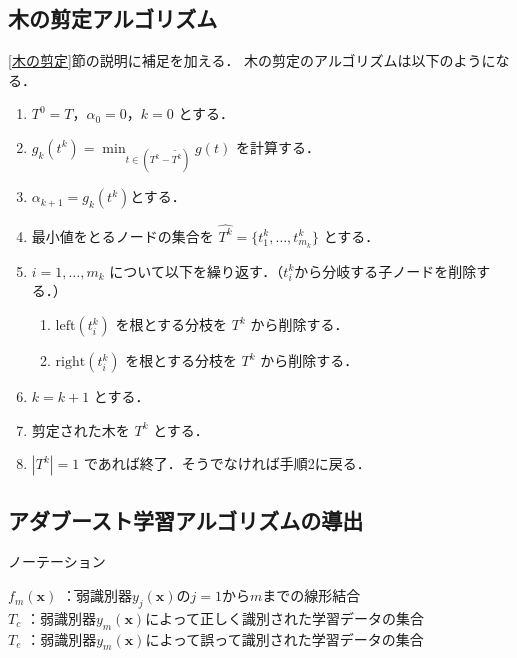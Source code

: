 \documentclass[dvipdfmx]{jreport}
\begin{document}
\subsection{木の剪定アルゴリズム}
\ref{木の剪定}節の説明に補足を加える．
木の剪定のアルゴリズムは以下のようになる．
\begin{tcolorbox}[title=\textbf{木の剪定アルゴリズム}]
    \begin{enumerate}
        \item $T^0 = T$，$\alpha_0=0$，$k=0$ とする．
        \item $g_k(t^k) = \min_{t \in (T^k - \tilde{T^k})}g(t)$ を計算する．
        \item $\alpha_{k+1} = g_k(t^k)$とする．
        \item 最小値をとるノードの集合を $\hat{T^k} = \{t^k_1, \ldots, t^k_{m_k}\}$ とする．
        \item $i = 1, \ldots, m_k$ について以下を繰り返す．（$t^k_i$から分岐する子ノードを削除する．）
        \begin{enumerate}
            \item $\text{left}(t^k_i)$ を根とする分枝を $T^k$ から削除する．
            \item $\text{right}(t^k_i)$ を根とする分枝を $T^k$ から削除する．
        \end{enumerate}
        \item $k = k + 1$ とする．
        \item 剪定された木を $T^k$ とする．
        \item $|T^k| = 1$ であれば終了．そうでなければ手順2に戻る．
    \end{enumerate}
\end{tcolorbox}


\subsection{アダブースト学習アルゴリズムの導出}
\begin{itembox}[l]{\large{ノーテーション}}
    \begin{tabbing}
        \hspace{15pt} \raisebox{0.5ex}{\tiny $\bullet$} $f_m(\bm{x})$ \=：弱識別器$y_j(\bm{x})$の$j=1$から$m$までの線形結合\\[0.5em]
        \hspace{15pt} \raisebox{0.5ex}{\tiny $\bullet$} $T_c$ \>：弱識別器$y_m(\bm{x})$によって正しく識別された学習データの集合 \\[0.5em]
        \hspace{15pt} \raisebox{0.5ex}{\tiny $\bullet$} $T_e$ \>：弱識別器$y_m(\bm{x})$によって誤って識別された学習データの集合
    \end{tabbing}
\end{itembox}
\end{document}
